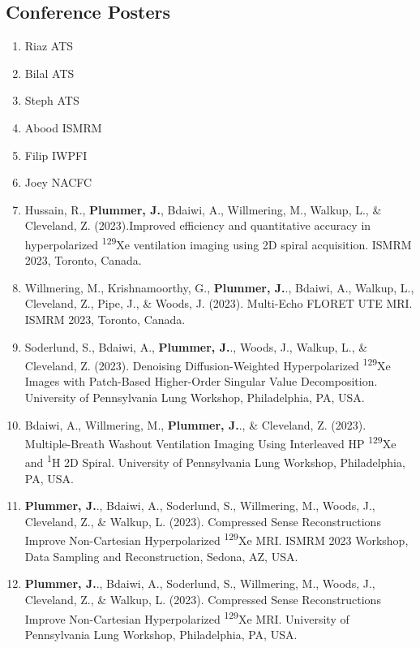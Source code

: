 \documentclass[12pt,]{scrartcl}
\begin{document}
\subsection{Conference Posters}\label{conferences}

\begin{enumerate}
  \leftskip-0.13in %

  \item Riaz ATS
  \item Bilal ATS
  \item Steph ATS
  \item Abood ISMRM
  \item Filip IWPFI
  \item Joey NACFC
  
    \item Hussain, R., \textbf{Plummer, J.}, Bdaiwi, A., Willmering, M., Walkup, L., \& Cleveland, Z. (2023).Improved efficiency and quantitative accuracy in hyperpolarized \textsuperscript{129}Xe ventilation imaging using 2D spiral acquisition. ISMRM 2023, Toronto, Canada.
    
  \item Willmering, M., Krishnamoorthy, G., \textbf{Plummer, J.}., Bdaiwi, A., Walkup, L., Cleveland, Z., Pipe, J., \& Woods, J. (2023). Multi-Echo FLORET UTE MRI. ISMRM 2023, Toronto, Canada.

  \item Soderlund, S., Bdaiwi, A., \textbf{Plummer, J.}., Woods, J., Walkup, L., \& Cleveland, Z. (2023). Denoising Diffusion-Weighted Hyperpolarized \textsuperscript{129}Xe Images with Patch-Based Higher-Order Singular Value Decomposition. University of Pennsylvania Lung Workshop, Philadelphia, PA, USA.
  
  \item Bdaiwi, A., Willmering, M., \textbf{Plummer, J.}., \& Cleveland, Z. (2023). Multiple-Breath Washout Ventilation Imaging Using Interleaved HP \textsuperscript{129}Xe and \textsuperscript{1}H 2D Spiral. University of Pennsylvania Lung Workshop, Philadelphia, PA, USA.
  
  \item \textbf{Plummer, J.}., Bdaiwi, A., Soderlund, S., Willmering, M., Woods, J., Cleveland, Z., \& Walkup, L. (2023). Compressed Sense Reconstructions Improve Non-Cartesian Hyperpolarized \textsuperscript{129}Xe MRI. ISMRM 2023 Workshop, Data Sampling and Reconstruction, Sedona, AZ, USA.  
  
  \item \textbf{Plummer, J.}., Bdaiwi, A., Soderlund, S., Willmering, M., Woods, J., Cleveland, Z., \& Walkup, L. (2023). Compressed Sense Reconstructions Improve Non-Cartesian Hyperpolarized \textsuperscript{129}Xe MRI. University of Pennsylvania Lung Workshop, Philadelphia, PA, USA.  
  

\end{enumerate}
\end{document}
